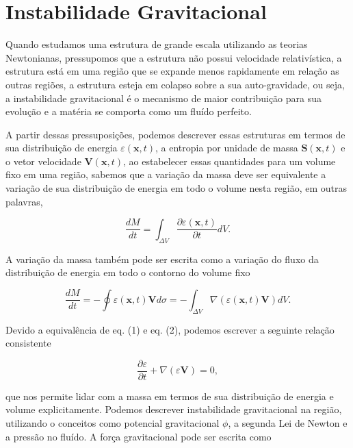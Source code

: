 	\chapter*{Instabilidade Gravitacional}

Quando estudamos uma estrutura de grande escala utilizando as teorias Newtonianas, pressupomos que a estrutura não possui velocidade relativística, a estrutura está em uma região que se expande menos rapidamente em relação as outras regiões, a estrutura esteja em colapso sobre a sua auto-gravidade, ou seja, a instabilidade gravitacional é o mecanismo de maior contribuição para sua evolução e a matéria se comporta como um fluído perfeito.

A partir dessas pressuposições, podemos descrever essas estruturas em termos de sua distribuição de energia $\varepsilon(\mathbf{x},t)$, a entropia por unidade de massa $\textbf{S}(\mathbf{x},t)$ e o vetor velocidade $\textbf{V}(\mathbf{x},t)$, ao estabelecer essas quantidades para um volume fixo em uma região, sabemos que a variação da massa deve ser equivalente a variação de sua distribuição de energia em todo o volume nesta região, em outras palavras, 

\begin{equation}\label{eq1}
	\frac{dM}{dt} = \int_{\Delta V} \frac{\partial \varepsilon(\mathbf{x},t)}{\partial t} dV.
\end{equation}

A variação da massa também pode ser escrita como a variação do fluxo da distribuição de energia em todo o contorno do volume fixo

\begin{equation}\label{eq2}
	\frac{dM}{dt} = - \oint \varepsilon(\mathbf{x},t)\mathbf{V} d\sigma = - \int_{\Delta V} \nabla (\varepsilon(\mathbf{x},t)\mathbf{V}) dV.
\end{equation}

Devido a equivalência de eq. (1) e eq. (2), podemos escrever a seguinte relação consistente

\begin{equation}\label{eq3}
	\frac{\partial \varepsilon}{\partial t} + \nabla (\varepsilon\mathbf{V}) = 0,
\end{equation}

que nos permite lidar com a massa em termos de sua distribuição de energia e volume explicitamente. Podemos descrever instabilidade gravitacional na região, utilizando o conceitos como potencial gravitacional $\phi$, a segunda Lei de Newton e a pressão no fluído. A força gravitacional pode ser escrita como

